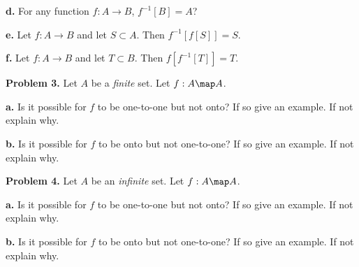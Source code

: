 \documentclass[oneside,12pt]{amsart}
\begin{document}
\bigskip
\bigskip

\textbf{d.} For any function  $f:A\to B$, $f^{-1}[B] = A$?

\bigskip
\bigskip

\textbf{e.} Let $f:A\to B$ and let $S\subset A$. Then $f^{-1}[f[S]] = S$.

\bigskip
\bigskip

\textbf{f.} Let $f:A\to B$ and let $T\subset B$. Then $f[f^{-1}[T]] = T$.

\bigskip

\textbf{Problem 3.} Let $A$ be a \emph{finite} set.
Let $f : A \map A$.

\smallskip

\textbf{a.} Is it possible for $f$ to be one-to-one but not onto? If so
give an example. If not explain why.

\bigskip
\bigskip

\textbf{b.} Is it possible for $f$ to be onto but not one-to-one? If so
give an example. If not explain why.

\textbf{Problem 4.} Let $A$ be an \emph{infinite} set.
Let $f : A \map A$.

\smallskip

\textbf{a.} Is it possible for $f$ to be one-to-one but not onto? If so
give an example. If not explain why.

\bigskip
\bigskip

\textbf{b.} Is it possible for $f$ to be onto but not one-to-one? If so
give an example. If not explain why.
\end{document}

